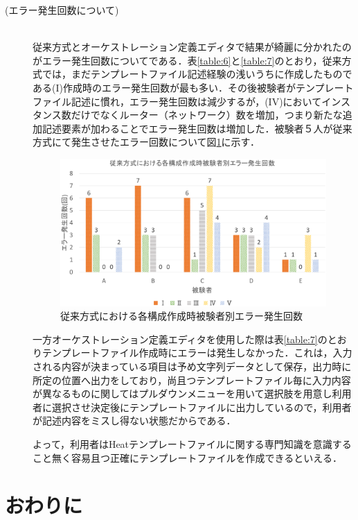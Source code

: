 \documentclass[mingoth]{kut-paper}		%
\begin{document}
\begin{description}
		\item[(エラー発生回数について)]\mbox{}\\
		従来方式とオーケストレーション定義エディタで結果が綺麗に分かれたのがエラー発生回数についてである．表\ref{table:6}と\ref{table:7}のとおり，従来方式では，まだテンプレートファイル記述経験の浅いうちに作成したものである(I)作成時のエラー発生回数が最も多い．その後被験者がテンプレートファイル記述に慣れ，エラー発生回数は減少するが，(I\hspace{-1pt}V)においてインスタンス数だけでなくルーター（ネットワーク）数を増加，つまり新たな追加記述要素が加わることでエラー発生回数は増加した．被験者５人が従来方式にて発生させたエラー回数について図\ref{graf:6}に示す．
		\vspace{-2.8mm}
		\begin{figure}[H]
			\begin{center}
				\includegraphics[scale=0.45]{Document/TemplateFile_ErrorGraf.eps}
				\caption{従来方式における各構成作成時被験者別エラー発生回数}
				\label{graf:6}
			\end{center}
		\end{figure}
		一方オーケストレーション定義エディタを使用した際は表\ref{table:7}のとおりテンプレートファイル作成時にエラーは発生しなかった．これは，入力される内容が決まっている項目は予め文字列データとして保存，出力時に所定の位置へ出力をしており，尚且つテンプレートファイル毎に入力内容が異なるものに関してはプルダウンメニューを用いて選択肢を用意し利用者に選択させ決定後にテンプレートファイルに出力しているので，利用者が記述内容をミスし得ない状態だからである．
		
		よって，利用者はHeatテンプレートファイルに関する専門知識を意識すること無く容易且つ正確にテンプレートファイルを作成できるといえる．
	\end{description}
\chapter{おわりに}
\end{document}
